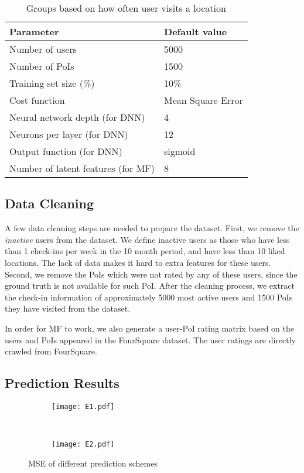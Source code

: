 \begin{table}[htbp]
\begin{center}
\caption{Groups based on how often user visits a location \label{settings}}
\begin{tabular}{|l|l|} \hline
\textbf{Parameter} & \textbf{Default value} \\ \hline
Number of users & 5000  \\ \hline
Number of PoIs & 1500 \\ \hline
Training set size (\%) & 10\% \\ \hline
Cost function & Mean Square Error \\ \hline
Neural network depth (for DNN)& 4 \\ \hline
Neurons per layer (for DNN) & 12 \\ \hline
Output function (for DNN) & sigmoid \\ \hline
Number of latent features (for MF) & 8 \\ \hline
\end{tabular}
\end{center}
\end{table}

\subsection{Data Cleaning}

A few data cleaning steps are needed to prepare the dataset. First, we remove the \textit{inactive} users from the dataset. We define inactive users as those who have less than 1 check-ins per week in the 10 month period, and have less than 10 liked locations. The lack of data makes it hard to extra features for these users. Second, we remove the PoIs which were not rated by any of these users, since the ground truth is not available for such PoI. After the cleaning process, we extract the check-in information of approximately 5000 most active users and 1500 PoIs they have visited from the dataset.

In order for MF to work, we also generate a user-PoI rating matrix based on the users and PoIs appeared in the FourSquare dataset. The user ratings are directly crawled from FourSquare.


\subsection{Prediction Results}

\begin{figure}[ht]%
        \centering
        \begin{subfigure}{0.25\textwidth}
               \texttt{[image: E1.pdf]}
        \end{subfigure}%
        ~ %
        \begin{subfigure}{0.25\textwidth}
                \texttt{[image: E2.pdf]}
        \end{subfigure}
         \caption{MSE of different prediction schemes}\label{E12}
         \vspace{-2mm}
\end{figure}

